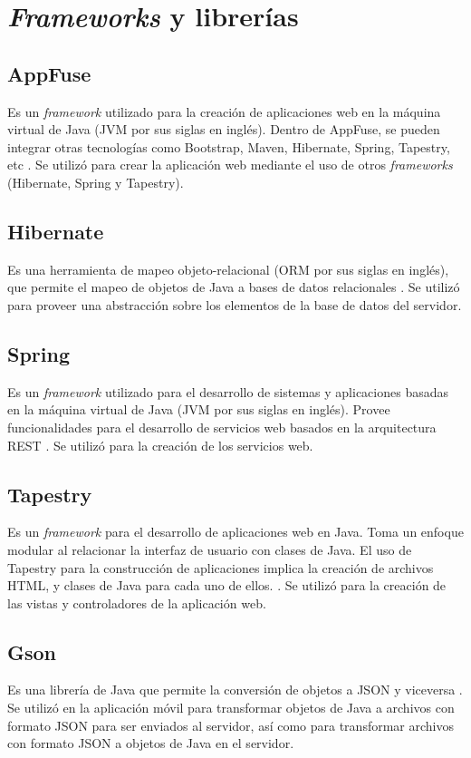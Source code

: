 \section{\textit{Frameworks} y librerías} \label{Frameworks y librerias}

\subsection{AppFuse}
Es un \textit{framework} utilizado para la creación de aplicaciones web en la máquina virtual de Java (JVM por sus siglas en inglés). Dentro de AppFuse, se pueden integrar otras tecnologías como Bootstrap, Maven, Hibernate, Spring, Tapestry, etc \cite{APF1}. Se utilizó para crear la aplicación web mediante el uso de otros \textit{frameworks} (Hibernate, Spring y Tapestry).

\subsection{Hibernate}
Es una herramienta de mapeo objeto-relacional (ORM por sus siglas en inglés), que permite el mapeo de objetos de Java a bases de datos relacionales \cite{HBR1}. Se utilizó para proveer una abstracción sobre los elementos de la base de datos del servidor.

\subsection{Spring}
Es un \textit{framework} utilizado para el desarrollo de sistemas y aplicaciones basadas en la máquina virtual de Java (JVM por sus siglas en inglés). Provee funcionalidades para el desarrollo de servicios web basados en la arquitectura REST \cite{SPRNG0}. Se utilizó para la creación de los servicios web.

\subsection{Tapestry}
Es un \textit{framework} para el desarrollo de aplicaciones web en Java. Toma un enfoque modular al relacionar la interfaz de usuario con clases de Java. El uso de Tapestry para la construcción de aplicaciones implica la creación de archivos HTML, y clases de Java para cada uno de ellos. \cite{ATP1}. Se utilizó para la creación de las vistas y controladores de la aplicación web.

\subsection{Gson}
Es una librería de Java que permite la conversión de objetos a JSON y viceversa \cite{GSN1}. Se utilizó en la aplicación móvil para transformar objetos de Java a archivos con formato JSON para ser enviados al servidor, así como para transformar archivos con formato JSON a objetos de Java en el servidor.

